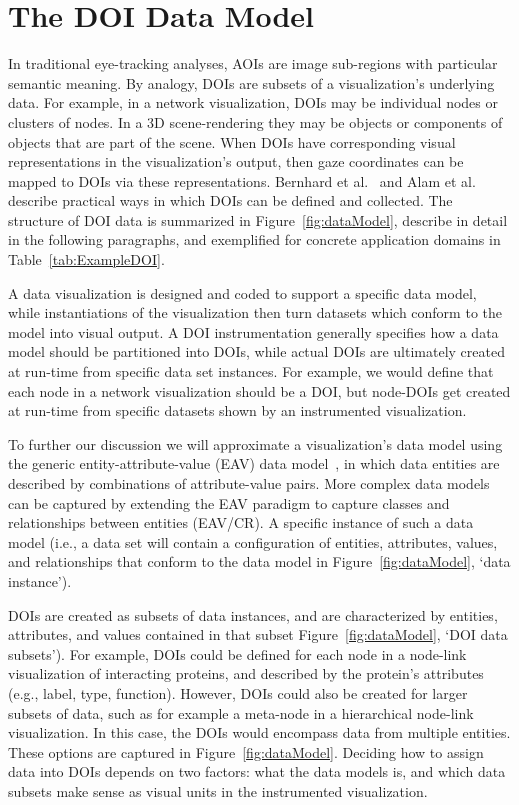 \section{The DOI Data Model}
\label{sec:DataModel}
In traditional eye-tracking analyses, AOIs are image sub-regions with particular semantic meaning. By analogy, DOIs are subsets of a visualization's underlying data. For example, in a network visualization, DOIs may be individual nodes or clusters of nodes. In a 3D scene-rendering they may be objects or components of objects that are part of the scene. When DOIs have corresponding visual representations in the visualization's output, then gaze coordinates can be mapped to DOIs via these representations. Bernhard et al.~\cite{bernhard2014gaze} and Alam et al.~\cite{alam15analyzing} describe practical ways in which DOIs can be defined and collected. The structure of DOI data is summarized in Figure~\ref{fig:dataModel}, describe in detail in the following paragraphs, and exemplified for concrete application domains in Table~\ref{tab:ExampleDOI}. 

A data visualization is designed and coded to support a specific data model, while instantiations of the visualization then turn datasets which conform to the model into visual output. A DOI instrumentation generally specifies how a data model should be partitioned into DOIs, while actual DOIs are ultimately created at run-time from specific data set instances. For example, we would define that each node in a network visualization should be a DOI, but node-DOIs get created at run-time from specific datasets shown by an instrumented visualization.

To further our discussion we will approximate a visualization's data model using the generic entity-attribute-value (EAV) data model~\cite{deran1991entity}, in which data entities are described by combinations of attribute-value pairs. More complex data models can be captured by extending the EAV paradigm to capture classes and relationships between entities (EAV/CR).  A specific instance of such a data model (i.e., a data set will contain a configuration of entities, attributes, values, and relationships that conform to the data model in Figure~\ref{fig:dataModel}, `data instance').  

DOIs are created as subsets of data instances, and are characterized by entities, attributes, and values contained in that subset Figure~\ref{fig:dataModel}, `DOI data subsets'). For example, DOIs could be defined for each node in a node-link visualization of interacting proteins, and described by the protein's attributes (e.g., label, type, function). However, DOIs could also be created for larger subsets of data, such as for example a meta-node in a hierarchical node-link visualization. In this case, the DOIs would encompass data from multiple entities. These options are captured in Figure~\ref{fig:dataModel}. Deciding how to assign data into DOIs depends on two factors: what the data models is, and which data subsets make sense as visual units in the instrumented visualization. 

